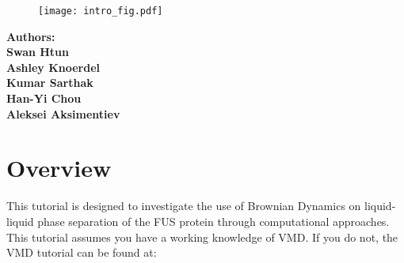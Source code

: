 \documentclass[letterpaper]{article}
\begin{document}
\vspace*{0.3in}
\noindent
{}

\begin{figure}[!ht]
\begin{center}
\texttt{[image: intro\_fig.pdf]}
\end{center}
\end{figure}

\begin{minipage}[b]{10cm}
{\bfseries  
\noindent Authors: \\
Swan Htun\\ Ashley Knoerdel\\ Kumar Sarthak\\ Han-Yi Chou\\ Aleksei Aksimentiev }

\end{minipage}

\newpage
\begin{latexonly}
\tableofcontents
\end{latexonly}
\newpage



\section*{\huge Overview}
This tutorial is designed to investigate the use of Brownian Dynamics on liquid-liquid phase separation of the FUS protein through computational approaches. This tutorial assumes you have a working knowledge of VMD.  If you do not, the VMD tutorial can be found at: \\[0.02cm] 
\end{document}
